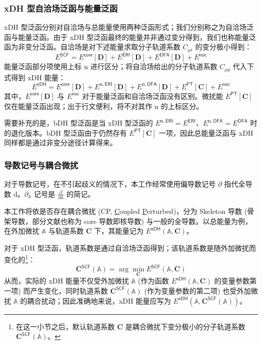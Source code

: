 \subsubsection{xDH 型自洽场泛函与能量泛函}

xDH 型泛函分别对自洽场与总能量使用两种泛函形式；我们分别称之为\textsf{自洽场泛函}与\textsf{能量泛函}。由于 xDH 型泛函最终的能量并非通过变分得到，我们也称能量泛函为非变分泛函。自洽场是对下述能量求取分子轨道系数 $C_{\mu i}$ 的变分极小得到：
\begin{equation}
  E^\textsf{SCF} = E^\textsf{core} [\mathbf{D}] + E^\textsf{ERI} [\mathbf{D}] + E^\textsf{DFA} [\mathbf{D}] + E^\textsf{nuc}
\end{equation}
能量泛函部分项使用上标 $\mathrm{n}$ 进行区分；将自洽场给出的分子轨道系数 $C_{\mu p}$ 代入下式得到 xDH 能量：
\begin{equation}
  E^\textsf{xDH} = E^\textsf{core} [\mathbf{D}] + E^{\mathrm{n}, \textsf{ERI}} [\mathbf{D}] + E^{\mathrm{n}, \textsf{DFA}} [\mathbf{D}] + E^\textsf{PT} [\mathbf{C}] + E^\textsf{nuc}
\end{equation}
其中，$E^\textsf{core} [\mathbf{D}]$ 与 $E^\textsf{nuc}$ 对于能量泛函和自洽场泛函没有区别。微扰能 $E^\textsf{PT} [\mathbf{C}]$ 仅在能量泛函出现；出于行文便利，将不对其作 $\mathrm{n}$ 的上标区分。

需要补充的是，bDH 型泛函是当 xDH 型泛函的 $E^{\mathrm{n}, \textsf{ERI}} = E^\textsf{ERI}$、$E^{\mathrm{n}, \textsf{DFA}} = E^\textsf{DFA}$ 时的退化版本。bDH 型泛函由于仍然存有 $E^\textsf{PT} [\mathbf{C}]$ 一项，因此总能量泛函与 xDH 同样都是通过非变分途径计算得来。

\subsubsection{导数记号与耦合微扰}

对于导数记号，在不引起歧义的情况下，本工作经常使用偏导数记号 $\partial$ 指代全导数 $\mathrm{d}$。$\partial_\mathbb{A}$ 记号是 $\frac{\partial}{\partial \mathbb{A}}$ 的简记。

本工作将依是否存在耦合微扰 (CP, \underline{C}oupled \underline{P}erturbed)，分为 Skeleton 导数 (骨架导数，部分文献也称为 core 导数即核导数) 与一般的全导数。以总能量为例，在外加微扰 $\mathbb{A}$ 与轨道系数 $\mathbf{C}$ 下，其能量记为 $E^\textsf{xDH} (\mathbb{A}, \mathbf{C})$。

对于 xDH 型泛函，轨道系数是通过自洽场泛函得到；该轨道系数是随外加微扰而变化的\footnote{在这一小节之后，默认轨道系数 $\mathbf{C}$ 是耦合微扰下变分极小的分子轨道系数 $\mathbf{C}^\textsf{SCF} (\mathbb{A})$。}：
\begin{equation*}
  \mathbf{C}^\textsf{SCF} (\mathbb{A}) = \arg \min_\mathbf{C} E^\textsf{SCF} (\mathbb{A}, \mathbf{C})
\end{equation*}
从而，实际的 xDH 能量不仅受外加微扰 $\mathbb{A}$ (作为函数 $E^\textsf{xDH} (\mathbb{A}, \mathbf{C})$ 的变量参数第一项) 而产生变化，同时轨道系数 $\mathbf{C}^\textsf{SCF} (\mathbb{A})$ (作为变量参数的第二项) 也受外加微扰 $\mathbb{A}$ 的耦合扰动；因此准确地来说，xDH 能量应写为 $E^\textsf{xDH} (\mathbb{A}, \mathbf{C}^\textsf{SCF} (\mathbb{A}))$。

